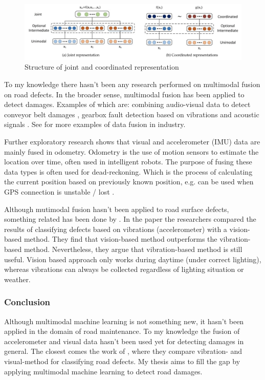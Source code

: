 \begin{figure}[ht]
\begin{center}
\includegraphics[width=\textwidth,keepaspectratio]{images/2_literature/joint-vs-coordinated-representations.png}
\end{center}
\caption{Structure of joint and coordinated representation \cite{Baltrusaitis2017}}
\label{fig:structure-joint-coordinated}
\end{figure}

To my knowledge there hasn't been any research performed on multimodal fusion on road defects. In the broader sense, multimodal fusion has been applied to detect damages. Examples of which are: combining audio-visual data to detect conveyor belt damages \cite{Che2021}, gearbox fault detection based on vibrations and acoustic signals \cite{Li2016}. See \cite{Olivan2018} for more examples of data fusion in industry.

Further exploratory research shows that visual and accelerometer (IMU) data are mainly fused in odometry. Odometry is the use of motion sensors to estimate the location over time, often used in intelligent robots. The purpose of fusing these data types is often used for dead-reckoning. Which is the process of calculating the current position based on previously known position, e.g. can be used when GPS connection is unstable / lost \cite{Jiang2017,Brossard2020}.

Although mutimodal fusion hasn't been applied to road surface defects, something related has been done by . In the paper the researchers compared the results of classifying defects based on vibrations (accelerometer) with a vision-based method. They find that vision-based method outperforms the vibration-based method. Nevertheless, they argue that vibration-based method is still useful. Vision based approach only works during daytime (under correct lighting), whereas vibrations can always be collected regardless of lighting situation or weather.

\subsubsection{Conclusion}
Although multimodal machine learning is not something new, it hasn't been applied in the domain of road maintenance. To my knowledge the fusion of accelerometer and visual data hasn't been used yet for detecting damages in general. The closest comes the work of , where they compare vibration- and visual-method for classifying road defects. My thesis aims to fill the gap by applying multimodal machine learning to detect road damages. 



